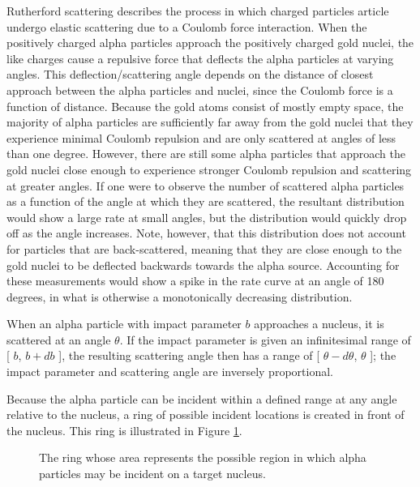\documentclass[a4paper]{article}
\begin{document}
\qq Rutherford scattering describes the process in which charged particles
article undergo elastic scattering due to a Coulomb force interaction. When the
positively charged alpha particles approach the positively charged gold nuclei,
the like charges cause a repulsive force that deflects the alpha particles at
varying angles. This deflection/scattering angle depends on the distance of
closest approach between the alpha particles and nuclei, since the Coulomb force
is a function of distance. Because the gold atoms consist of mostly empty space,
the majority of alpha particles are sufficiently far away from the gold nuclei
that they experience minimal Coulomb repulsion and are only scattered at angles
of less than one degree. However, there are still some alpha particles that
approach the gold nuclei close enough to experience stronger Coulomb repulsion
and scattering at greater angles. If one were to observe the number of scattered
alpha particles as a function of the angle at which they are scattered, the
resultant distribution would show a large rate at small angles, but the
distribution would quickly drop off as the angle increases. Note, however, that
this distribution does not account for particles that are back-scattered,
meaning that they are close enough to the gold nuclei to be deflected backwards
towards the alpha source. Accounting for these measurements would show a spike
in the rate curve at an angle of 180 degrees, in what is otherwise a
monotonically decreasing distribution.

\qq When an alpha particle with impact parameter \( b \) approaches a nucleus,
it is scattered at an angle \( \theta \). If the impact parameter is given an
infinitesimal range of [ \( b \), \( b + db \) ], the resulting scattering angle
then has a range of [ \( \theta - d\theta \), \( \theta \) ]; the impact
parameter and scattering angle are inversely proportional.

\qq Because the alpha particle can be incident within a defined range at any
angle relative to the nucleus, a ring of possible incident locations is created
in front of the nucleus. This ring is illustrated in Figure
\ref{fig:crossSecRing}.

\begin{figure}[H]
  \begin{center}
  \end{center}
  \caption{The ring whose area represents the possible region in which alpha
    particles may be incident on a target nucleus.}
  \label{fig:crossSecRing}
\end{figure}
\end{document}
